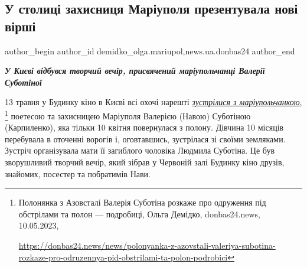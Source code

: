  
 
 
 
 
 
\subsection{У столиці захисниця Маріуполя презентувала нові вірші}
\label{sec:14_05_2023.stz.news.ua.donbas24.1.u_stolyci_zahysnycja_mrpl_prezent_novi_virshi}
 
\ifcmt
 author_begin
   author_id demidko_olga.mariupol,news.ua.donbas24
 author_end
\fi


\begin{center}
  \em\color{blue}\bfseries\Large
  У Києві відбувся творчий вечір, присвячений маріупольчанці Валерії Суботіної
\end{center}

13 травня у Будинку кіно в Києві всі охочі нарешті \href{https://donbas24.news/news/polonyanka-z-azovstali-valeriya-subotina-rozkaze-pro-odruzennya-pid-obstrilami-ta-polon-podrobici}{\emph{зустрілися з
маріупольчанкою}},
\footnote{Полонянка з Азовсталі Валерія Суботіна розкаже про одруження під обстрілами та полон — подробиці, Ольга Демідко, donbas24.news, 10.05.2023, \par\url{https://donbas24.news/news/polonyanka-z-azovstali-valeriya-subotina-rozkaze-pro-odruzennya-pid-obstrilami-ta-polon-podrobici}}
поетесою та захисницею Маріуполя Валерією (Навою) Суботіною
(Карпиленко), яка тільки 10 квітня повернулася з полону. Дівчина 10 місяців
перебувала в оточенні ворогів і, оговтавшись, зустрілася зі своїми земляками.
Зустріч організувала мати її загиблого чоловіка Людмила Суботіна. Це був
зворушливий творчий вечір, який зібрав у Червоній залі Будинку кіно друзів,
знайомих, посестер та побратимів Нави.

